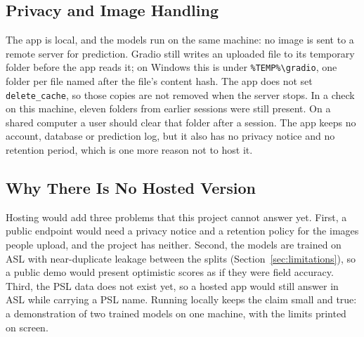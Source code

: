 

\subsection{Privacy and Image Handling}

The app is local, and the models run on the same machine: no image is sent to a remote server for prediction. Gradio still writes an uploaded file to its temporary folder before the app reads it; on Windows this is under \texttt{\%TEMP\%\textbackslash gradio}, one folder per file named after the file's content hash. The app does not set \texttt{delete\_cache}, so those copies are not removed when the server stops. In a check on this machine, eleven folders from earlier sessions were still present. On a shared computer a user should clear that folder after a session. The app keeps no account, database or prediction log, but it also has no privacy notice and no retention period, which is one more reason not to host it.

\subsection{Why There Is No Hosted Version}

Hosting would add three problems that this project cannot answer yet. First, a public endpoint would need a privacy notice and a retention policy for the images people upload, and the project has neither. Second, the models are trained on ASL with near-duplicate leakage between the splits (Section~\ref{sec:limitations}), so a public demo would present optimistic scores as if they were field accuracy. Third, the PSL data does not exist yet, so a hosted app would still answer in ASL while carrying a PSL name. Running locally keeps the claim small and true: a demonstration of two trained models on one machine, with the limits printed on screen.
